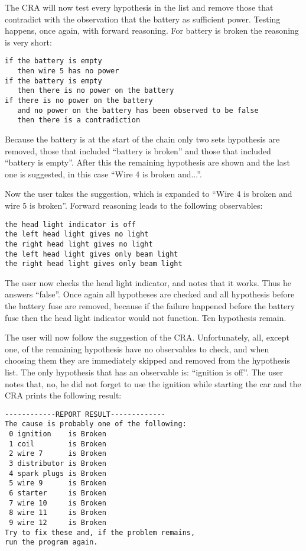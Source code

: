 The CRA will now test every hypothesis in the list and remove those that contradict with the observation that the battery as sufficient power. Testing happens, once again, with forward reasoning. For battery is broken the reasoning is very short:

\begin{verbatim}
if the battery is empty 
   then wire 5 has no power
if the battery is empty 
   then there is no power on the battery
if there is no power on the battery 
   and no power on the battery has been observed to be false
   then there is a contradiction
\end{verbatim}

Because the battery is at the start of the chain only two sets hypothesis are removed, those that included ``battery is broken'' and those that included ``battery is empty''. After this the remaining hypothesis are shown and the last one is suggested, in this case ``Wire 4 is broken and...''.

Now the user takes the suggestion, which is expanded to ``Wire 4 is broken and wire 5 is broken''. Forward reasoning leads to the following observables:
\begin{verbatim}
the head light indicator is off
the left head light gives no light
the right head light gives no light
the left head light gives only beam light
the right head light gives only beam light
\end{verbatim}

The user now checks the head light indicator, and notes that it works. Thus he answers ``false''. Once again all hypotheses are checked and all hypothesis before the battery fuse are removed, because if the failure happened before the battery fuse then the head light indicator would not function. Ten hypothesis remain.

The user will now follow the suggestion of the CRA. Unfortunately, all, except one, of the remaining hypothesis have no observables to check, and when choosing them they are immediately skipped and removed from the hypothesis list. The only hypothesis that has an observable is: ``ignition is off''. The user notes that, no, he did not forget to use the ignition while starting the car and the CRA prints the following result:

\begin{verbatim}
------------REPORT RESULT-------------
The cause is probably one of the following: 
 0 ignition    is Broken
 1 coil        is Broken
 2 wire 7      is Broken
 3 distributor is Broken
 4 spark plugs is Broken
 5 wire 9      is Broken
 6 starter     is Broken
 7 wire 10     is Broken
 8 wire 11     is Broken
 9 wire 12     is Broken
Try to fix these and, if the problem remains, 
run the program again.
\end{verbatim}

